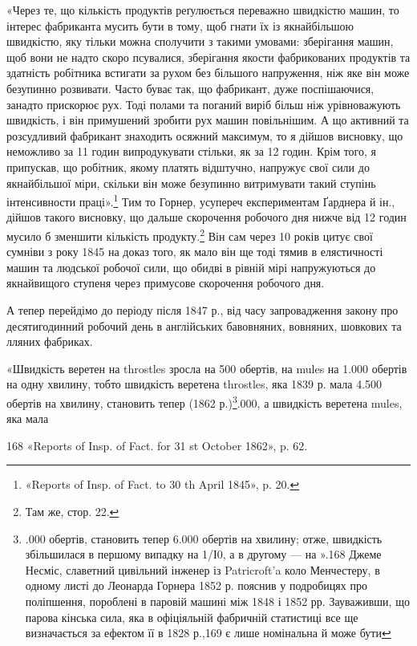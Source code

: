 «Через те, що кількість продуктів реґулюється переважно
швидкістю машин, то інтерес фабриканта мусить бути в тому,
щоб гнати їх із якнайбільшою швидкістю, яку тільки можна
сполучити з такими умовами: зберігання машин, щоб вони не
надто скоро псувалися, зберігання якости фабрикованих продуктів
та здатність робітника встигати за рухом без більшого напруження,
ніж яке він може безупинно розвивати. Часто буває так,
що фабрикант, дуже поспішаючися, занадто прискорює рух.
Тоді полами та поганий виріб більш ніж урівноважують швидкість,
і він примушений зробити рух машин повільнішим. А що
активний та розсудливий фабрикант знаходить осяжний максимум,
то я дійшов висновку, що неможливо за 11 годин випродукувати
стільки, як за 12 годин. Крім того, я припускав, що робітник,
якому платять відштучно, напружує свої сили до якнайбільшої
міри, скільки він може безупинно витримувати такий
ступінь інтенсивности праці».\footnote{
«Reports of Insp. of Fact. to 30 th April 1845», p. 20.
} Тим то Горнер, усупереч експериментам
Ґарднера й ін., дійшов такого висновку, що дальше скорочення
робочого дня нижче від 12 годин мусило б зменшити
кількість продукту.\footnote{
Там же, стор. 22.
} Він сам через 10 років цитує свої сумніви
з року 1845 на доказ того, як мало він ще тоді тямив в елястичності
машин та людської робочої сили, що обидві в рівній мірі
напружуються до якнайвищого ступеня через примусове скорочення
робочого дня.

А тепер перейдімо до періоду після 1847 р., від часу запровадження
закону про десятигодинний робочий день в англійських
бавовняних, вовняних, шовкових та лляних фабриках.

«Швидкість веретен на throstles зросла на 500 обертів, на
mules на 1.000 обертів на одну хвилину, тобто швидкість веретена
throstles, яка 1839 р. мала 4.500 обертів на хвилину, становить
тепер (1862 р.)\footnote{
.000 обертів, становить тепер 6.000 обертів на хвилину; отже,
швидкість збільшилася в першому випадку на 1/І0, а в другому —
на ».168 Джеме Несміс, славетний цивільний інженер із
Patricroft’a коло Менчестеру, в одному листі до Леонарда Горнера
1852 р. пояснив у подробицях про поліпшення, пороблені в паровій
машині між 1848 і 1852 рр. Зауваживши, що парова кінська
сила, яка в офіціяльній фабричній статистиці все ще визначається
за ефектом її в 1828 р.,169 є лише номінальна й може бути
}.000, а швидкість веретена mules, яка мала

168 «Reports of Insp. of Fact. for 31 st October 1862», p. 62.

